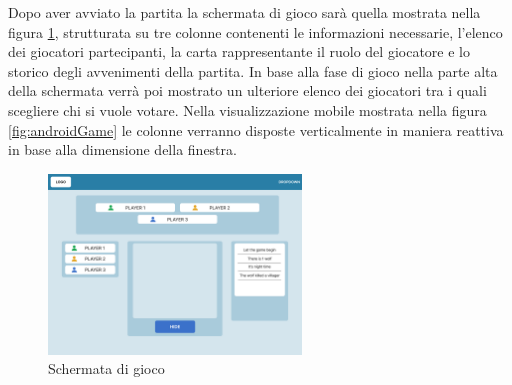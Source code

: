 Dopo aver avviato la partita la schermata di gioco sarà quella mostrata nella figura \ref{fig:pcGame}, strutturata su tre colonne contenenti le informazioni necessarie, l'elenco dei giocatori partecipanti, la carta rappresentante il ruolo del giocatore e lo storico degli avvenimenti della partita. In base alla fase di gioco nella parte alta della schermata verrà poi mostrato un ulteriore elenco dei giocatori tra i quali scegliere chi si vuole votare. Nella visualizzazione mobile mostrata nella figura \ref{fig:androidGame} le colonne verranno disposte verticalmente in maniera reattiva in base alla dimensione della finestra.

\begin{figure}[H]
\centering
\includegraphics[width=0.6\textwidth]{img/figma/Wireframe-4.png}
\caption{Schermata di gioco}
\label{fig:pcGame}
\end{figure}


